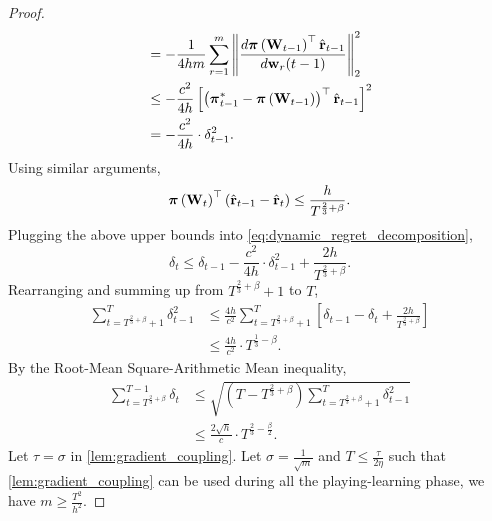 \begin{proof}
\begin{equation*}
\begin{split}
    &= - \frac{1}{4 h m} \sum\limits_{r=1}^{m}{ \left\| \frac{d {\boldsymbol{\pi}}\left( {\mathbf{W}}_{t-1} \right)^\top \hat{{\mathbf{r}}}_{t-1}}{d {\mathbf{w}}_r(t-1)} \right\|_2^2 } \\
    &\le - \frac{c^2}{4 h} \left[ \left( {{\boldsymbol{\pi}}_{t-1}^*} - {\boldsymbol{\pi}}\left( {\mathbf{W}}_{t-1} \right) \right)^\top \hat{{\mathbf{r}}}_{t-1}  \right]^2 \\
    &= - \frac{c^2}{4 h} \cdot \delta_{t-1}^2.
\end{split}
\end{equation*}
Using similar arguments,
\begin{equation*}
    {\boldsymbol{\pi}}\left( {\mathbf{W}}_t \right)^\top \left( \hat{{\mathbf{r}}}_{t-1} - \hat{{\mathbf{r}}}_t  \right) \le \frac{h}{T^{\frac{2}{3} + \beta}}.
\end{equation*}
Plugging the above upper bounds into \cref{eq:dynamic_regret_decomposition},
\begin{equation*}
    \delta_t \le \delta_{t-1} - \frac{c^2}{4 h} \cdot \delta_{t-1}^2 + \frac{2h}{T^{\frac{2}{3} + \beta}}.
\end{equation*}
Rearranging and summing up from $T^{\frac{2}{3} + \beta} + 1$ to $T$,
\begin{equation*}
\begin{split}
    \sum\limits_{t=T^{\frac{2}{3}+ \beta}+1}^{T}{\delta_{t-1}^2} &\le \frac{4 h}{ c^2} \sum\limits_{t=T^{\frac{2}{3}+ \beta}+1}^{T} { \left[ \delta_{t-1} - \delta_t + \frac{2h}{T^{\frac{2}{3} + \beta}} \right] } \\
    &\le \frac{4 h}{ c^2} \cdot T^{\frac{1}{3} - \beta}.
\end{split}
\end{equation*}
By the Root-Mean Square-Arithmetic Mean inequality,
\begin{equation*}
\begin{split}
    \sum\limits_{t=T^{\frac{2}{3}+ \beta}}^{T-1}{\delta_{t}} &\le \sqrt{\left(T  - T^{\frac{2}{3}+ \beta} \right) \sum\limits_{t=T^{\frac{2}{3}+ \beta}+1}^{T}{\delta_{t-1}^2}} \\
    &\le \frac{2 \sqrt{h}}{c} \cdot T^{\frac{2}{3} - \frac{\beta}{2}}.
\end{split}
\end{equation*}
Let $\tau = \sigma$ in \cref{lem:gradient_coupling}. Let $\sigma = \frac{1}{\sqrt{m}}$ and $T \le \frac{\tau}{2 \eta}$ such that \cref{lem:gradient_coupling} can be used during all the playing-learning phase, we have $m \ge \frac{T^2}{h^2}$.
\end{proof}



